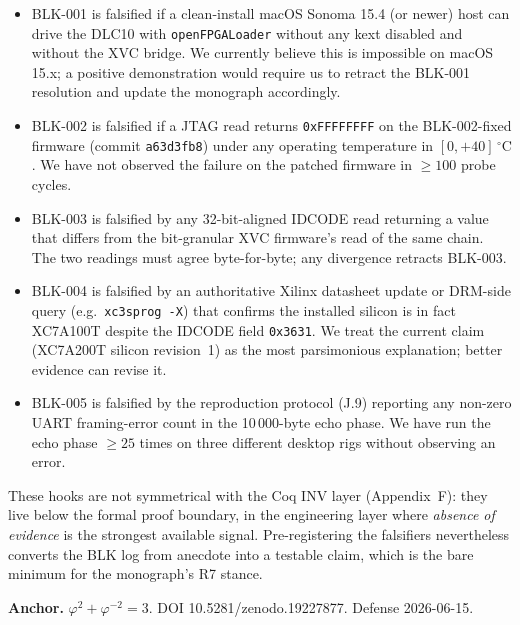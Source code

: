 \begin{itemize}
  \item BLK-001 is falsified if a clean-install macOS Sonoma 15.4 (or
    newer) host can drive the DLC10 with \texttt{openFPGALoader} without
    any kext disabled and without the XVC bridge. We currently believe
    this is impossible on macOS 15.x; a positive demonstration would
    require us to retract the BLK-001 resolution and update the
    monograph accordingly.
  \item BLK-002 is falsified if a JTAG read returns \texttt{0xFFFFFFFF}
    on the BLK-002-fixed firmware (commit \texttt{a63d3fb8}) under any
    operating temperature in $[0, +40]\,^\circ\mathrm{C}$. We have not
    observed the failure on the patched firmware in $\geq 100$ probe
    cycles.
  \item BLK-003 is falsified by any 32-bit-aligned IDCODE read returning
    a value that differs from the bit-granular XVC firmware's read of
    the same chain. The two readings must agree byte-for-byte; any
    divergence retracts BLK-003.
  \item BLK-004 is falsified by an authoritative Xilinx datasheet
    update or DRM-side query (e.g.\ \texttt{xc3sprog -X}) that confirms
    the installed silicon is in fact XC7A100T despite the IDCODE field
    \texttt{0x3631}. We treat the current claim (XC7A200T silicon
    revision~1) as the most parsimonious explanation; better evidence
    can revise it.
  \item BLK-005 is falsified by the reproduction protocol (J.9)
    reporting any non-zero UART framing-error count in the 10\,000-byte
    echo phase. We have run the echo phase $\geq 25$ times on three
    different desktop rigs without observing an error.
\end{itemize}

These hooks are not symmetrical with the Coq INV layer (Appendix~F): they
live below the formal proof boundary, in the engineering layer where
\emph{absence of evidence} is the strongest available signal. Pre-registering
the falsifiers nevertheless converts the BLK log from anecdote into a
testable claim, which is the bare minimum for the monograph's R7 stance.

\textbf{Anchor.} \(\varphi^2 + \varphi^{-2} = 3\). DOI
10.5281/zenodo.19227877. Defense 2026-06-15.
